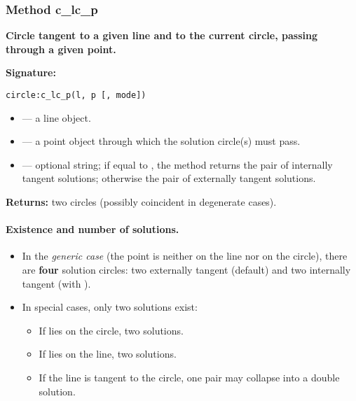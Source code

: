 \vspace{1em}
\begin{tkzexample}[latex = .5\textwidth]
\begin{center}
\end{center}
\end{tkzexample}


\subsubsection{Method c\_lc\_p}
\label{ssub:method_c_lc_p}
\textbf{Circle tangent to a given line and to the current circle, passing through a given point.}

\medskip
\noindent
\textbf{Signature:}
\begin{verbatim}
circle:c_lc_p(l, p [, mode])
\end{verbatim}

\begin{itemize}
  \item {} — a line object.
  \item {} — a point object through which the solution circle(s) must pass.
  \item {} — optional string; if equal to , the method
        returns the pair of internally tangent solutions; otherwise the pair of
        externally tangent solutions.
\end{itemize}

\noindent
\textbf{Returns:} two circles (possibly coincident in degenerate cases).


\paragraph*{Existence and number of solutions.}
\begin{itemize}
  \item In the \emph{generic case} (the point  is neither on the line nor on the circle),
        there are \textbf{four} solution circles:
        two externally tangent (default) and two internally tangent (with ).
  \item In special cases, only two solutions exist:
    \begin{itemize}
      \item If  lies on the circle, two solutions.
      \item If  lies on the line, two solutions.
      \item If the line is tangent to the circle, one pair may collapse into a double solution.
    \end{itemize}
\end{itemize}


